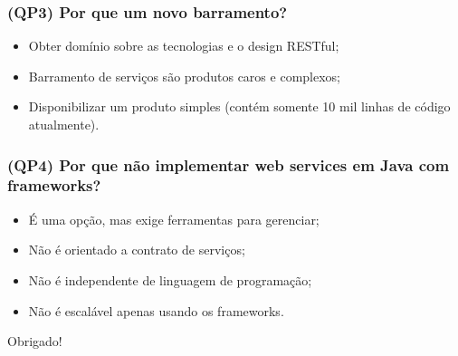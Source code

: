 \documentclass{beamer}
\begin{document}
\begin{frame}
  \frametitle{(QP3) Por que um novo barramento?}

	  \begin{itemize}
		\item<1->Obter domínio sobre as tecnologias e o design RESTful;
		\item<1->Barramento de serviços são produtos caros e complexos;
		\item<1->Disponibilizar um produto simples (contém somente 10 mil linhas de código atualmente).
					
	   \end{itemize}
  
\end{frame}


\begin{frame}
  \frametitle{(QP4) Por que não implementar web services em Java com frameworks?}

	  \begin{itemize}
		\item<1->É uma opção, mas exige ferramentas para gerenciar;
		\item<1->Não é orientado a contrato de serviços;
		\item<1->Não é independente de linguagem de programação;
		\item<1->Não é escalável apenas usando os frameworks.
	   \end{itemize}
  
\end{frame}



\begin{frame}[c]{ }
\centering
  \huge{Obrigado!}
\end{frame}
\end{document}
